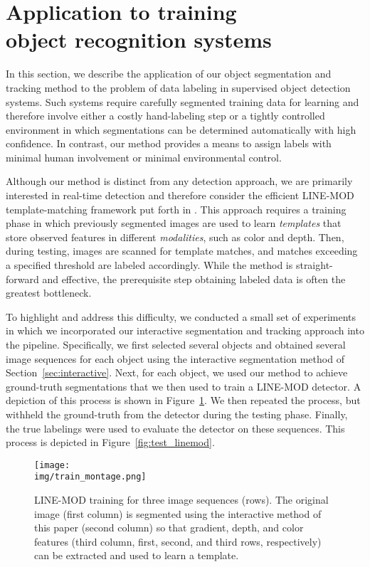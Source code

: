 \documentclass[conference]{IEEEtran}
\newcommand{\img}{img}
\begin{document}
\section{Application to training \\ object recognition systems}
\label{sec:application}

In this section, we describe the application of our object segmentation and tracking method to the problem of data labeling in supervised object detection systems.  Such systems require carefully segmented training data for learning and therefore involve either a costly hand-labeling step or a tightly controlled environment in which segmentations can be determined automatically with high confidence.  In contrast, our method provides a means to assign labels with minimal human involvement or minimal environmental control.

Although our method is distinct from any detection approach, we are primarily interested in real-time detection and therefore consider the efficient LINE-MOD template-matching framework put forth in \citet{hinterstoisser2011a}.  This approach requires a training phase in which previously segmented images are used to learn \textit{templates} that store observed features in different \textit{modalities}, such as color and depth.  Then, during testing, images are scanned for template matches, and matches exceeding a specified threshold are labeled accordingly.  While the method is straight-forward and effective, the prerequisite step obtaining labeled data is often the greatest bottleneck.

To highlight and address this difficulty, we conducted a small set of experiments in which we incorporated our interactive segmentation and tracking approach into the pipeline.  Specifically, we first selected several objects and obtained several image sequences for each object using the interactive segmentation method of Section~\ref{sec:interactive}.  Next, for each object, we used our method to achieve ground-truth segmentations that we then used to train a LINE-MOD detector.  A depiction of this process is shown in Figure~\ref{fig:train_linemod}.  We then repeated the process, but withheld the ground-truth from the detector during the testing phase.  Finally, the true labelings were used to evaluate the detector on these sequences.  This process is depicted in Figure~\ref{fig:test_linemod}.

\begin{figure}
  \centering
  \texttt{[image: \\img/train\_montage.png]}
  \caption{\small{LINE-MOD training for three image sequences (rows).  The original image (first column) is segmented using the interactive method of this paper (second column) so that gradient, depth, and color features (third column, first, second, and third rows, respectively) can be extracted and used to learn a template.}}
  \label{fig:train_linemod}
  \end{figure}
\end{document}
